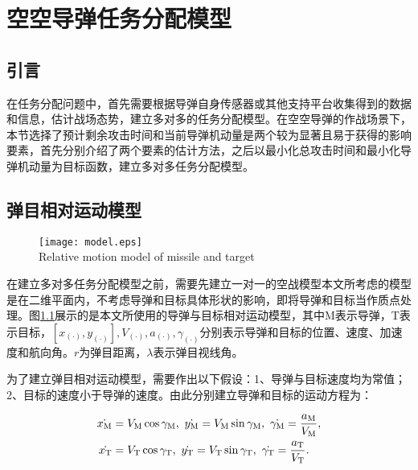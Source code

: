 
\chapter{空空导弹任务分配模型}
\label{chap:model}

\section{引言}
\label{model:sec:intro}

在任务分配问题中，首先需要根据导弹自身传感器或其他支持平台收集得到的数据和信息，估计战场态势，建立多对多的任务分配模型。在空空导弹的作战场景下，本节选择了预计剩余攻击时间和当前导弹机动量是两个较为显著且易于获得的影响要素，首先分别介绍了两个要素的估计方法，之后以最小化总攻击时间和最小化导弹机动量为目标函数，建立多对多任务分配模型。


\section{弹目相对运动模型}
\label{model:sec:move}

\begin{figure}[!htp]
  \centering
  \texttt{[image: model.eps]} \\
    {Relative motion model of missile and target}
 \label{fig:model}
\end{figure}

在建立多对多任务分配模型之前，需要先建立一对一的空战模型本文所考虑的模型是在二维平面内，不考虑导弹和目标具体形状的影响，即将导弹和目标当作质点处理。图\ref{fig:model}展示的是本文所使用的导弹与目标相对运动模型，其中M表示导弹，T表示目标，$[x_{(\cdot)},y_{(\cdot)}],V_{(\cdot)},a_{(\cdot)},\gamma_{(\cdot)}$分别表示导弹和目标的位置、速度、加速度和航向角。$r$为弹目距离，$\lambda$表示弹目视线角。

为了建立弹目相对运动模型，需要作出以下假设：1、导弹与目标速度均为常值；2、目标的速度小于导弹的速度。由此分别建立导弹和目标的运动方程为：

\begin{align}
	\label{model:eq:Mmotion} \dot{x_{\text M}}&=V_{\text M} \cos{\gamma_{\text M}},\ \dot{y_{\text M}}=V_{\text M} \sin{\gamma_{\text M}},\ \dot{\gamma_{\text M}}=\dfrac{a_{\text M}}{V_{\text M}},\\
	\label{model:eq:Tmotion} \dot{x_{\text T}}&=V_{\text T} \cos{\gamma_{\text T}},\ \dot{y_{\text T}}=V_{\text T} \sin{\gamma_{\text T}},\ \dot{\gamma_{\text T}}=\dfrac{a_{\text T}}{V_{\text T}}.
\end{align}

